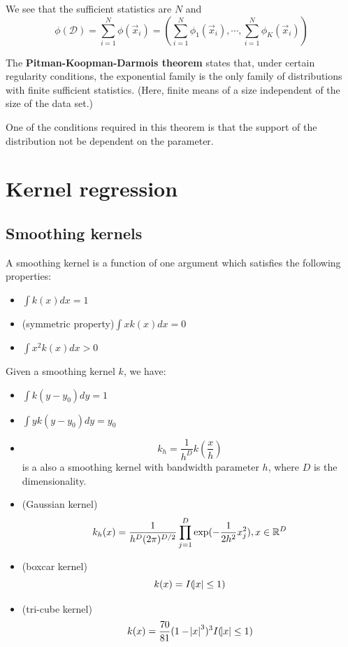 \begin{refsection}
We see that the sufficient statistics are $N$ and
\begin{equation}
\phi(\mathcal{D})=\sum\limits_{i=1}^N \phi(\vec{x}_i)=(\sum\limits_{i=1}^N \phi_1(\vec{x}_i),\cdots,\sum\limits_{i=1}^N \phi_K(\vec{x}_i))
\end{equation}

The \textbf{Pitman-Koopman-Darmois theorem} states that, under certain regularity conditions, the exponential family is the only family of distributions with finite sufficient statistics. (Here, finite means of a size independent of the size of the data set.)

One of the conditions required in this theorem is that the support of the distribution not be dependent on the parameter.


\section{Kernel regression}
\subsection{Smoothing kernels}
\begin{definition}\cite[509]{murphy2012machine}
	A smoothing kernel is a function of one argument which satisfies the following properties:
	\begin{itemize}
		\item $\int k(x) dx= 1$
		\item (symmetric property)$\int xk(x) dx = 0$
		\item $\int x^2k(x) dx > 0$
	\end{itemize}
\end{definition}

\begin{lemma}
	Given a smoothing kernel $k$, we have:
	\begin{itemize}
		\item $\int k(y-y_0)dy = 1$
		\item $\int yk(y - y_0)dy = y_0$
		\item $$k_h = \frac{1}{h^D}k(\frac{x}{h})$$ is a also a smoothing kernel with bandwidth parameter $h$, where $D$ is the dimensionality. 
	\end{itemize}
\end{lemma}


\begin{example}\hfill
	\begin{itemize}
		\item (Gaussian kernel)
		$$k_h(x) = \frac{1}{h^D(2\pi)^{D/2}} \prod_{j=1}^D \exp(-\frac{1}{2h^2}x_j^2),x\in \mathbb{R}^D$$
		\item (boxcar kernel)
		$$k(x) = I(\abs{x} \leq 1)$$
		\item (tri-cube kernel)
		$$k(x) = \frac{70}{81}(1 - \abs{x}^3)^3I(\abs{x}\leq 1)$$
	\end{itemize}
\end{example}





\end{refsection}
